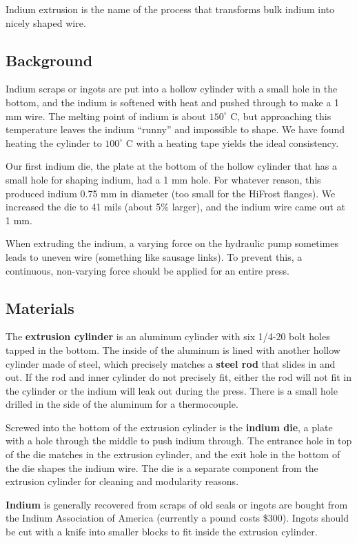 Indium extrusion is the name of the process that transforms bulk indium into nicely shaped wire.

\subsection{Background} 

Indium scraps or ingots are put into a hollow cylinder with a small hole in the bottom, and the indium is softened with heat and pushed through to make a 1 mm wire.  The melting point of indium is about $150 ^\circ$ C, but approaching this temperature leaves the indium ``runny'' and impossible to shape.  We have found heating the cylinder to $100 ^\circ$ C with a heating tape yields the ideal consistency.

Our first indium die, the plate at the bottom of the hollow cylinder that has a small hole for shaping indium, had a 1 mm hole.  For whatever reason, this produced indium 0.75 mm in diameter (too small for the HiFrost flanges).  We increased the die to 41 mils (about 5\% larger), and the indium wire came out at 1 mm.  

When extruding the indium, a varying force on the hydraulic pump sometimes leads to uneven wire (something like sausage links).  To prevent this, a continuous, non-varying force should be applied for an entire press.

\subsection{Materials}
The \textbf{extrusion cylinder} is an aluminum cylinder with six 1/4-20 bolt holes tapped in the bottom.  The inside of the aluminum is lined with another hollow cylinder made of steel, which precisely matches a \textbf{steel rod} that slides in and out.  If the rod and inner cylinder do not precisely fit, either the rod will not fit in the cylinder or the indium will leak out during the press.  There is a small hole drilled in the side of the aluminum for a thermocouple.

Screwed into the bottom of the extrusion cylinder is the \textbf{indium die}, a plate with a hole through the middle to push indium through.  The entrance hole in top of the die matches in the extrusion cylinder, and the exit hole in the bottom of the die shapes the indium wire.  The die is a separate component from the extrusion cylinder for cleaning and modularity reasons.

\textbf{Indium} is generally recovered from scraps of old seals or ingots are bought from the Indium Association of America (currently a pound costs \$300).  Ingots should be cut with a knife into smaller blocks to fit inside the extrusion cylinder.

